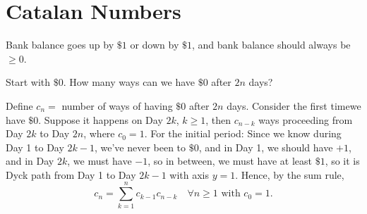 \section{Catalan Numbers}
\begin{eg}
    Bank balance goes up by \(\$ 1\) or down by \(\$ 1\), and bank balance should always be \(\ge 0\).    
\end{eg}
\begin{question}
    Start with \(\$ 0\). How many ways can we have \(\$ 0\) after \(2n\) days?   
\end{question}
\begin{answer}
    Define \(c_n = \) number of ways of having \(\$ 0\) after \(2n\) days. Consider the first timewe have \(\$ 0\). Suppose it happens on Day \(2k\), \(k \ge 1\), then \(c_{n-k}\) ways proceeding from Day \(2k\) to Day \(2n\), where \(c_0 = 1\). For the initial period: Since we know during Day 1 to Day \(2k - 1\), we've never been to \(\$0\), and in Day 1, we should have \(+1\), and in Day \(2k\), we must have \(-1\), so in between, we must have at least \(\$1\), so it is Dyck path from Day 1 to Day \(2k - 1\) with axis \(y = 1\). Hence, by the sum rule, 
    \[
        c_n = \sum_{k=1}^{n} c_{k-1} c_{n - k} \quad \forall n \ge 1 \text{ with } c_0 = 1.
    \]       
    

\end{answer}
